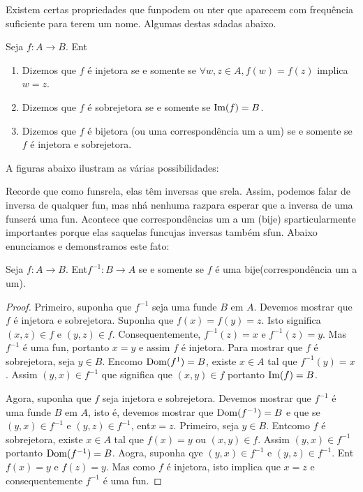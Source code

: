 Existem certas propriedades que fun\coes podem ou n\ao ter que aparecem com frequ\^encia suficiente para terem um nome. Algumas destas s\ao dadas abaixo.
\begin{definb}
Seja $f:A\to B$. Ent\ao
\begin{enumerate}[{\bf a)}]
\item Dizemos que $f$ \'e injetora se e somente se $\forall w,z\in A, f(w)=f(z)$ implica $w=z$. 
\item Dizemos que $f$ \'e sobrejetora se e somente se $\operatorname{Im}(f)=B$.
\item Dizemos que $f$ \'e bijetora (ou uma correspond\^encia um a um) se e somente se $f$ \'e injetora e sobrejetora.
\end{enumerate}
\end{definb}
A figuras abaixo ilustram as v\'arias possibilidades:

%
%
%
%
%
%
%
%
%
%

Recorde que como fun\coes s\ao rela\cois, elas t\^em inversas que s\ao rela\cois. Assim, podemos falar de inversa de qualquer fun\caoi, mas n\ao h\'a nenhuma raz\ao para esperar que a inversa de uma fun\cao ser\'a uma fun\caoi. Acontece que correspond\^encias um a um (bije\cois) s\ao particularmente importantes porque elas s\ao aquelas fun\coes cujas inversas tamb\'em s\ao fun\cois. Abaixo enunciamos e demonstramos este fato:
\begin{teob}\label{functeo13}
Seja $f:A\to B$. Ent\ao $f^{-1}:B\to A$ se e somente se $f$ \'e uma bije\cao (correspond\^encia um a um).
\end{teob}
\begin{proof}
Primeiro, suponha que $f^{-1}$ seja uma fun\cao de $B$ em $A$. Devemos mostrar que $f$ \'e injetora e sobrejetora. Suponha que $f(x)=f(y)=z$. Isto significa $(x,z)\in f$ e $(y,z)\in f$. Consequentemente, $f^{-1}(z)=x$ e $f^{-1}(z)=y$. Mas $f^{-1}$ \'e uma fun\caoi, portanto $x=y$ e assim $f$ \'e injetora. Para mostrar que $f$ \'e sobrejetora, seja $y\in B$. En\tao como $\operatorname{Dom}(f^{1})=B$, existe $x\in A$ tal que $f^{-1}(y)=x$. Assim $(y,x)\in f^{-1}$ que significa que $(x,y)\in f$ portanto $\operatorname{Im}(f)=B$.

Agora, suponha que $f$ seja injetora e sobrejetora. Devemos mostrar que $f^{-1}$ \'e uma fun\cao de $B$ em $A$, isto \'e, devemos mostrar que $\operatorname{Dom}(f^{-1})=B$ e que se $(y,x)\in f^{-1}$ e $(y,z)\in f^{-1}$, ent\ao $x=z$. Primeiro, seja $y\in B$. Ent\ao como $f$ \'e sobrejetora, existe $x\in A$ tal que $f(x)=y$ ou $(x,y)\in f$. Assim $(y,x)\in f^{-1}$ portanto $\operatorname{Dom}(f^{-1})=B$. Aogra, suponha qye $(y,x)\in f^{-1}$ e $(y,z)\in f^{-1}$. Ent\ao $f(x)=y$ e $f(z)=y$. Mas como $f$ \'e injetora, isto implica que $x=z$ e consequentemente $f^{-1}$ \'e uma fun\caoi. 
\end{proof}
\\

